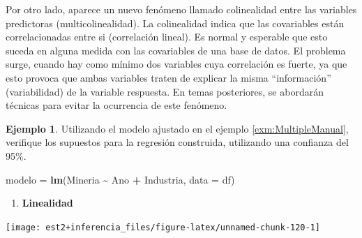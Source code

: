 \documentclass[
  11pt,
]{book}
\newenvironment{Shaded}{\begin{snugshade}}{\end{snugshade}}
\newcommand{\AttributeTok}[1]{\textcolor[rgb]{0.13,0.29,0.53}{#1}}
\newcommand{\FunctionTok}[1]{\textcolor[rgb]{0.13,0.29,0.53}{\textbf{#1}}}
\newcommand{\NormalTok}[1]{#1}
\newcommand{\OtherTok}[1]{\textcolor[rgb]{0.56,0.35,0.01}{#1}}
\newcommand{\SpecialCharTok}[1]{\textcolor[rgb]{0.81,0.36,0.00}{\textbf{#1}}}
\newcommand{\StringTok}[1]{\textcolor[rgb]{0.31,0.60,0.02}{#1}}
\providecommand{\tightlist}{%
  \setlength{\itemsep}{0pt}\setlength{\parskip}{0pt}}
\theoremstyle{definition}
\theoremstyle{definition}
\newtheorem{example}{Ejemplo}[chapter]
\theoremstyle{definition}
\theoremstyle{definition}
\theoremstyle{remark}
\begin{document}
Por otro lado, aparece un nuevo fenómeno llamado colinealidad entre las variables predictoras (multicolinealidad). La colinealidad indica que las covariables están correlacionadas entre si (correlación lineal). Es normal y esperable que esto suceda en alguna medida con las covariables de una base de datos. El problema surge, cuando hay como mínimo dos variables cuya correlación es fuerte, ya que esto provoca que ambas variables traten de explicar la misma ``información'' (variabilidad) de la variable respuesta. En temas posteriores, se abordarán técnicas para evitar la ocurrencia de este fenómeno.

\begin{example}
Utilizando el modelo ajustado en el ejemplo \ref{exm:MultipleManual}, verifique los supuestos para la regresión construida, utilizando una confianza del 95\%.

\begin{Shaded}
\begin{Highlighting}[]
\NormalTok{modelo }\OtherTok{=} \FunctionTok{lm}\NormalTok{(Mineria }\SpecialCharTok{\textasciitilde{}}\NormalTok{ Ano }\SpecialCharTok{+}\NormalTok{ Industria, }\AttributeTok{data =}\NormalTok{ df)}
\end{Highlighting}
\end{Shaded}

\begin{enumerate}
\def\labelenumi{\arabic{enumi}.}
\tightlist
\item
  \textbf{Linealidad}
\end{enumerate}

\begin{Shaded}
\end{Shaded}

\begin{center}\texttt{[image: est2+inferencia\_files/figure-latex/unnamed-chunk-120-1]} \end{center}


\end{example}
\end{document}
